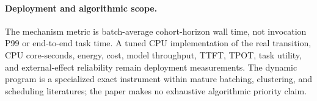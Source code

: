 \paragraph{Deployment and algorithmic scope.}
The mechanism metric is batch-average cohort-horizon wall time, not invocation
P99 or end-to-end task time. A tuned CPU implementation of the real transition,
CPU core-seconds, energy, cost, model throughput, TTFT, TPOT, task utility, and
external-effect reliability remain deployment measurements. The dynamic
program is a specialized exact instrument within mature batching, clustering,
and scheduling literatures; the paper makes no exhaustive algorithmic priority
claim.
